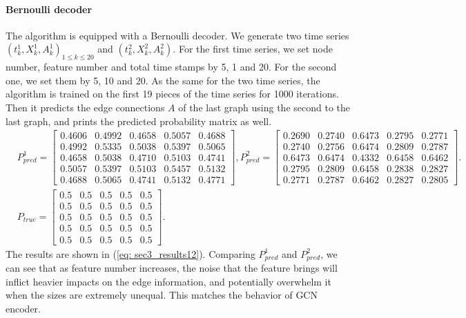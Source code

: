 \paragraph{Bernoulli decoder}
The algorithm is equipped with a Bernoulli decoder.
We generate two time series $(t^1_k, X^1_k, A^1_k)_{1\leq k\leq 20}$ and $(t^2_k, X^2_k, A^2_k)$. 
For the first time series, we set node number, feature number and total time stamps by 5, 1 and 20. 
For the second one, we set them by 5, 10 and 20. 
As the same for the two time series, the algorithm is trained on the first 19 pieces of the time series for 1000 iterations. 
Then it predicts the edge connections $A$ of the last graph using the second to the last graph, 
and prints the predicted probability matrix as well. 
\begin{align}
    \label{eq: sec3_results12}
    &P^1_{pred}=\begin{bmatrix}
        0.4606& 0.4992& 0.4658& 0.5057& 0.4688 \\
        0.4992& 0.5335& 0.5038& 0.5397& 0.5065 \\
        0.4658& 0.5038& 0.4710& 0.5103& 0.4741 \\
        0.5057& 0.5397& 0.5103& 0.5457& 0.5132 \\
        0.4688& 0.5065& 0.4741& 0.5132& 0.4771
    \end{bmatrix},
    P^2_{pred}=\begin{bmatrix}
        0.2690& 0.2740& 0.6473& 0.2795& 0.2771 \\
        0.2740& 0.2756& 0.6474& 0.2809& 0.2787 \\
        0.6473& 0.6474& 0.4332& 0.6458& 0.6462 \\
        0.2795& 0.2809& 0.6458& 0.2838& 0.2827 \\
        0.2771& 0.2787& 0.6462& 0.2827& 0.2805
    \end{bmatrix}. \\
    &P_{true}=\begin{bmatrix}
        0.5& 0.5& 0.5& 0.5& 0.5 \\
        0.5& 0.5& 0.5& 0.5& 0.5 \\
        0.5& 0.5& 0.5& 0.5& 0.5 \\
        0.5& 0.5& 0.5& 0.5& 0.5 \\
        0.5& 0.5& 0.5& 0.5& 0.5
    \end{bmatrix}.
\end{align}  
The results are shown in (\ref{eq: sec3_results12}). 
Comparing $P^1_{pred}$ and $P^2_{pred}$, we can see that as feature number increases, 
the noise that the feature brings will inflict heavier impacts on the edge information,
and potentially overwhelm it when the sizes are extremely unequal. 
This matches the behavior of GCN encoder. 

